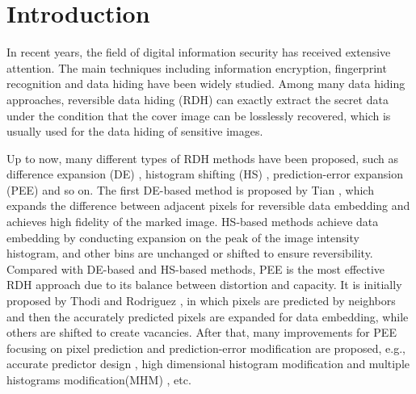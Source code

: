 \documentclass[review,3p,10pt,sort&compress]{elsarticle}
\begin{document}
\section{Introduction}\label{sec:1}

In recent years, the field of digital information security has received extensive attention. The main techniques including information encryption, fingerprint recognition and data hiding have been widely studied. Among many data hiding approaches, reversible data hiding (RDH) can exactly extract the secret data under the condition that the cover image can be losslessly recovered, which is usually used for the data hiding of sensitive images.

Up to now, many different types of RDH methods have been proposed, such as difference expansion (DE) \cite{
Tian2003DE,
Qin2013An,
Thodi2007Expansion,
Hu2009DE,
Li2013A},
histogram shifting (HS) \cite{
Hong2009Reversible,
Hong2010A,
Xiaolong2013General,
Wang2018A},
prediction-error expansion (PEE) \cite{
Sachnev2009Reversible,
Tsai2009Reversible,
Gao2011Lossless,
Li2011Efficient,
Hong2011Adaptive,
Wu2012Reversible,
Qin2013An,
Ou2013Pairwise,
Dragoi2014Local,
Li2015Efficient,
Dragoi2016Adaptive,
Wang2017Rate}
and so on. The first DE-based method is proposed by Tian \cite{Tian2003DE}, which expands the difference between adjacent pixels for reversible data embedding and achieves high fidelity of the marked image. HS-based methods achieve data embedding by conducting expansion on the peak of the image intensity histogram, and other bins are unchanged or shifted to ensure reversibility. Compared with DE-based and HS-based methods, PEE is the most effective RDH approach due to its balance between distortion and capacity. It is initially proposed by Thodi and Rodriguez \cite{Thodi2007Expansion}, in which pixels are predicted by neighbors and then the accurately predicted pixels are expanded for data embedding, while others are shifted to create vacancies. After that, many improvements for PEE focusing on pixel prediction and prediction-error modification are proposed, e.g., accurate predictor design \cite{Thodi2007Expansion,Fallahpour2008Reversible,Hu2009DE,Hong2009Reversible,Sachnev2009Reversible,Ioan2014Local,Ioan2015On}, high dimensional histogram modification \cite{Ou2013Pairwise,Li2013A,Dragoi2016Adaptive} and multiple histograms modification(MHM) \cite{Li2015Efficient,Xiang2015A,Bo2016Improved}, etc.
\end{document}
